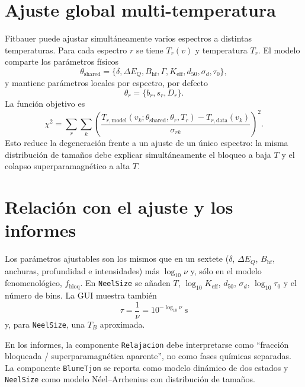 \documentclass[11pt,a4paper]{article}
\newcommand{\BHF}{B_{\mathrm{hf}}}
\newcommand{\dEQ}{\Delta E_Q}
\newcommand{\code}[1]{\texttt{\small #1}}
\begin{document}
\section{Ajuste global multi-temperatura}

Fitbauer puede ajustar simultáneamente varios espectros a distintas
temperaturas. Para cada espectro $r$ se tiene $T_r(v)$ y temperatura $T_r$. El modelo comparte los parámetros físicos
\begin{equation}
  \theta_{\mathrm{shared}}=\{\delta,\dEQ,\BHF,\Gamma,K_{\mathrm{eff}},d_{50},
  \sigma_d,\tau_0\},
\end{equation}
y mantiene parámetros locales por espectro, por defecto
\begin{equation}
  \theta_r=\{b_r,s_r,D_r\}.
\end{equation}
La función objetivo es
\begin{equation}
  \chi^2=\sum_r\sum_k
  \left(\frac{T_{r,\mathrm{model}}(v_k;\theta_{\mathrm{shared}},\theta_r,T_r)
  -T_{r,\mathrm{data}}(v_k)}{\sigma_{rk}}\right)^2.
\end{equation}
Esto reduce la degeneración frente a un ajuste de un único espectro: la misma
distribución de tamaños debe explicar simultáneamente el bloqueo a baja
$T$ y el colapso superparamagnético a alta $T$.

\section{Relación con el ajuste y los informes}

Los parámetros ajustables son los mismos que en un sextete ($\delta$, $\dEQ$,
$\BHF$, anchuras, profundidad e intensidades) más $\log_{10}\nu$ y, sólo en el
modelo fenomenológico, $f_{\mathrm{bloq}}$. En \code{NeelSize} se añaden $T$,
$\log_{10}K_{\mathrm{eff}}$, $d_{50}$, $\sigma_d$, $\log_{10}\tau_0$ y el número
de bins. La GUI muestra también
\begin{equation}
  \tau=\frac{1}{\nu}=10^{-\log_{10}\nu}\;\mathrm{s}
\end{equation}
y, para \code{NeelSize}, una $T_B$ aproximada.

En los informes, la componente \code{Relajacion} debe interpretarse como
``fracción bloqueada / superparamagnética aparente'', no como fases químicas
separadas. La componente \code{BlumeTjon} se reporta como modelo dinámico de dos
estados y \code{NeelSize} como modelo Néel--Arrhenius con distribución de tamaños.
\end{document}
